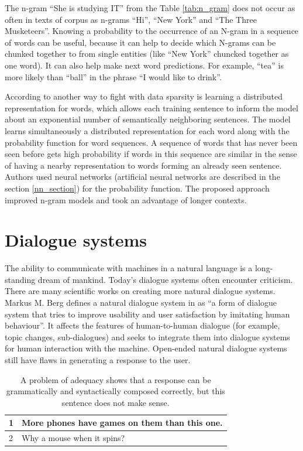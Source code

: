 The n-gram ``She is studying IT'' from the Table \ref{tab:n_gram} does not occur as often in texts of corpus as n-grams ``Hi'', ``New York'' and ``The Three Musketeers''. Knowing a probability to the occurrence of an N-gram in a sequence of words can be useful, because it can help to decide which N-grams can be chunked together to from single entities (like ``New York'' chuncked together as one word). It can also help make next word predictions. For example, ``tea'' is more likely than ``ball'' in the phrase ``I would like to drink''.


According to \cite{bengio2003neural} another way to fight with data sparsity is learning a distributed representation for words, which allows each training sentence to inform the model about an exponential number of semantically neighboring sentences. The model learns simultaneously a distributed representation for each word along with the probability function for word sequences. A sequence of words that has never been seen before gets high probability if words in this sequence are similar in the sense of having a nearby representation to words forming an already seen sentence. Authors used neural networks (artificial neural networks are described in the section \ref{nn_section}) for the probability function. The proposed approach improved n-gram models and took an advantage of longer contexts.


\section{Dialogue systems}\label{nlg_ds_problems}
The ability to communicate with machines in a natural language is a long-standing dream of mankind. Today's dialogue systems often encounter criticism. There are many scientific works on creating more natural dialogue systems. Markus M. Berg defines a natural dialogue system in \cite{berg2014modelling} as ``a form of dialogue system that tries to improve usability and user satisfaction by imitating human behaviour''. It affects the features of human-to-human dialogue (for example, topic changes, sub-dialogues) and seeks to integrate them into dialogue systems for human interaction with the machine. Open-ended natural dialogue systems still have flaws in generating a response to the user.

\begin{table}[ht]
\centering
 \begin{tabular}{|p{0.5cm}|p{8cm}|} 
 \hline
 1 & More phones have games on them than this one. \\
 \hline
 2 & Why a mouse when it spins? \\
 \hline
 \end{tabular}
 \caption{A problem of adequacy shows that a response can be grammatically and syntactically composed correctly, but this sentence does not make sense.}
\label{tab:adequacy_prob}
\end{table}

